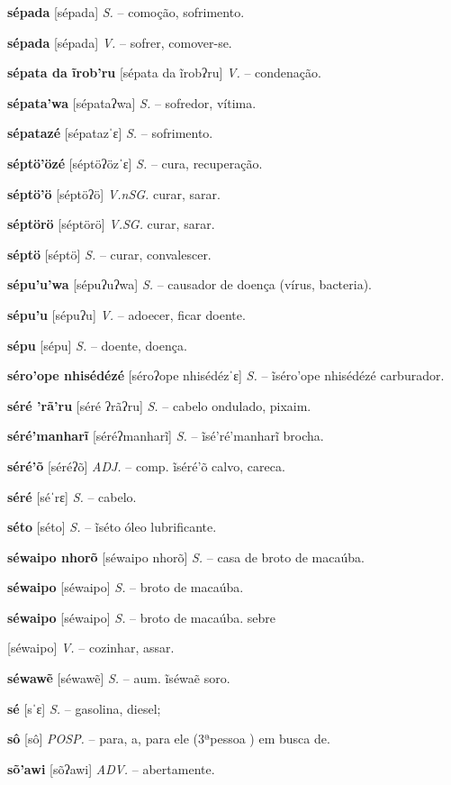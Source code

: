 {\textbf{sépada} [sépada] \textit{S.} -- comoção, sofrimento.

\textbf{sépada} [sépada] \textit{V.} -- sofrer, comover-se.

\textbf{sépata da ĩrob'ru} [sépata da ĩrobʔru] \textit{V.} -- condenação.

\textbf{sépata'wa} [sépataʔwa] \textit{S.} -- sofredor, vítima.

\textbf{sépatazé} [sépatazˈɛ] \textit{S.} -- sofrimento.

\textbf{séptö'özé} [séptöʔözˈɛ] \textit{S.} -- cura, recuperação.

\textbf{séptö'ö} [séptöʔö] \textit{V.nSG.} curar, sarar.

\textbf{séptörö} [séptörö] \textit{V.SG.} curar, sarar.

\textbf{séptö} [séptö] \textit{S.} -- curar, convalescer.

\textbf{sépu'u'wa} [sépuʔuʔwa] \textit{S.} -- causador de doença (vírus, bacteria).

\textbf{sépu'u} [sépuʔu] \textit{V.} -- adoecer, ficar doente.

\textbf{sépu} [sépu] \textit{S.} -- doente, doença.

\textbf{séro'ope nhisédézé} [séroʔope nhisédézˈɛ] \textit{S.} -- ĩséro'ope nhisédézé carburador.

\textbf{séré 'rã'ru} [séré ʔrãʔru] \textit{S.} -- cabelo ondulado, pixaim.

\textbf{séré'manharĩ} [séréʔmanharĩ] \textit{S.} -- ĩsé'ré'manharĩ brocha.

\textbf{séré'õ} [séréʔõ] \textit{ADJ.} -- comp. ĩséré'õ calvo, careca.

\textbf{séré} [séˈrɛ] \textit{S.} -- cabelo.

\textbf{séto} [séto] \textit{S.} -- ĩséto óleo lubrificante.

\textbf{séwaipo nhorõ} [séwaipo nhorõ] \textit{S.} -- casa de broto de macaúba.

\textbf{séwaipo} [séwaipo] \textit{S.} -- broto de macaúba.

\textbf{séwaipo} [séwaipo] \textit{S.} -- broto de macaúba. sebre} [séwaipo] \textit{V.} -- cozinhar, assar.

\textbf{séwawẽ} [séwawẽ] \textit{S.} -- aum. ĩséwaẽ soro.

\textbf{sé} [sˈɛ] \textit{S.} -- gasolina, diesel;

\textbf{sô} [sô] \textit{POSP.} -- para, a, para ele (3ªpessoa ) em busca de.

\textbf{sõ'awi} [sõʔawi] \textit{ADV.} -- abertamente.

